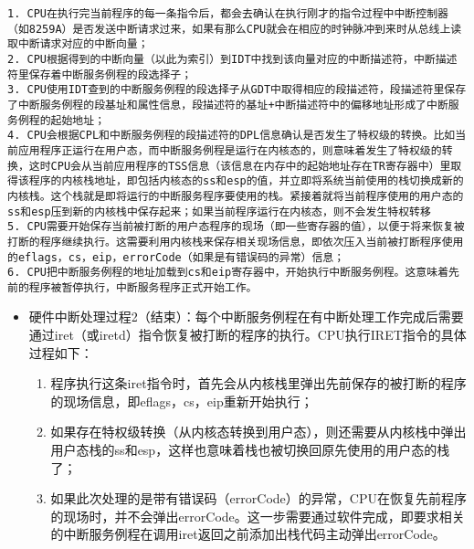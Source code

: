 \begin{lstlisting}
1. CPU在执行完当前程序的每一条指令后，都会去确认在执行刚才的指令过程中中断控制器（如8259A）是否发送中断请求过来，如果有那么CPU就会在相应的时钟脉冲到来时从总线上读取中断请求对应的中断向量；
2. CPU根据得到的中断向量（以此为索引）到IDT中找到该向量对应的中断描述符，中断描述符里保存着中断服务例程的段选择子；
3. CPU使用IDT查到的中断服务例程的段选择子从GDT中取得相应的段描述符，段描述符里保存了中断服务例程的段基址和属性信息，段描述符的基址+中断描述符中的偏移地址形成了中断服务例程的起始地址；
4. CPU会根据CPL和中断服务例程的段描述符的DPL信息确认是否发生了特权级的转换。比如当前应用程序正运行在用户态，而中断服务例程是运行在内核态的，则意味着发生了特权级的转换，这时CPU会从当前应用程序的TSS信息（该信息在内存中的起始地址存在TR寄存器中）里取得该程序的内核栈地址，即包括内核态的ss和esp的值，并立即将系统当前使用的栈切换成新的内核栈。这个栈就是即将运行的中断服务程序要使用的栈。紧接着就将当前程序使用的用户态的ss和esp压到新的内核栈中保存起来；如果当前程序运行在内核态，则不会发生特权转移
5. CPU需要开始保存当前被打断的用户态程序的现场（即一些寄存器的值），以便于将来恢复被打断的程序继续执行。这需要利用内核栈来保存相关现场信息，即依次压入当前被打断程序使用的eflags，cs，eip，errorCode（如果是有错误码的异常）信息；
6. CPU把中断服务例程的地址加载到cs和eip寄存器中，开始执行中断服务例程。这意味着先前的程序被暂停执行，中断服务程序正式开始工作。
\end{lstlisting}

\begin{itemize}
\item
  硬件中断处理过程2（结束）：每个中断服务例程在有中断处理工作完成后需要通过iret（或iretd）指令恢复被打断的程序的执行。CPU执行IRET指令的具体过程如下：

  \begin{enumerate}
  \def\labelenumi{\arabic{enumi}.}
  \tightlist
  \item
    程序执行这条iret指令时，首先会从内核栈里弹出先前保存的被打断的程序的现场信息，即eflags，cs，eip重新开始执行；
  \item
    如果存在特权级转换（从内核态转换到用户态），则还需要从内核栈中弹出用户态栈的ss和esp，这样也意味着栈也被切换回原先使用的用户态的栈了；
  \item
    如果此次处理的是带有错误码（errorCode）的异常，CPU在恢复先前程序的现场时，并不会弹出errorCode。这一步需要通过软件完成，即要求相关的中断服务例程在调用iret返回之前添加出栈代码主动弹出errorCode。
  \end{enumerate}
\end{itemize}

